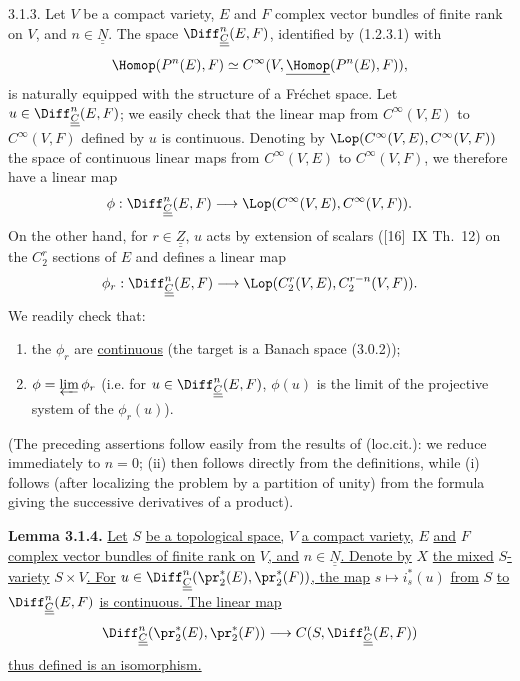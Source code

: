 3.1.3. Let $V$ be a compact variety, $E$ and $F$ complex vector bundles of finite rank on $V$, and $n\in\underline{\underline{N}}$. The space $\Diff^n_{\underline{\underline{C}}}(E,F)$, identified by (1.2.3.1) with
\[
  \Homop(P^n(E),F)\simeq C^\infty(V,\underline{\Homop}(P^n(E),F)),
\]
is naturally equipped with the structure of a Fréchet space. Let $u\in\Diff^n_{\underline{\underline{C}}}(E,F)$; we easily check that the linear map from $C^\infty(V,E)$ to $C^\infty(V,F)$ defined by $u$ is continuous. Denoting by $\Lop(C^\infty(V,E),C^\infty(V,F))$ the space of continuous linear maps from $C^\infty(V,E)$ to $C^\infty(V,F)$, we therefore have a linear map
\[
  \phi:\Diff^n_{\underline{\underline{C}}}(E,F)
  \longrightarrow \Lop(C^\infty(V,E),C^\infty(V,F)).
\]
On the other hand, for $r\in\underline{\underline{Z}}$, $u$ acts by extension of scalars ([16]~IX Th.~12) on the $C^r_2$ sections of $E$ and defines a linear map
\[
  \phi_r:\Diff^n_{\underline{\underline{C}}}(E,F)
  \longrightarrow \Lop(C^r_2(V,E),C^{r-n}_2(V,F)).
\]
We readily check that:
\begin{enumerate}[label=(\roman*)]
\item the $\phi_r$ are \uline{continuous} (the target is a Banach space
%
(3.0.2));
\item $\phi=\varprojlim\phi_r$ (i.e.
for $u\in\Diff^n_{\underline{\underline{C}}}(E,F)$, $\phi(u)$ is the limit of the projective system of the $\phi_r(u)$).
\end{enumerate}
(The preceding assertions follow easily from the results of (loc.cit.): we reduce immediately to $n=0$; (ii) then follows directly from the definitions, while (i) follows (after localizing the problem by a partition of unity) from the formula giving the successive derivatives of a product).

\textbf{Lemma 3.1.4.} \uline{Let} $S$ \uline{be a topological space,} $V$ \uline{a compact variety,} $E$ \uline{and} $F$ \uline{complex vector bundles of finite rank on} $V$\uline{, and} $n\in\underline{\underline{N}}$\uline{. Denote by} $X$ \uline{the mixed} $S$\uline{-variety} $S\times V$\uline{. For} $u\in\Diff^n_{\underline{\underline{C}}}(\pr_2^*(E),\pr_2^*(F))$\uline{, the map} $s\mapsto i_s^*(u)$ \uline{from} $S$ \uline{to} $\Diff^n_{\underline{\underline{C}}}(E,F)$ \uline{is continuous. The linear map}
\[
  \Diff^n_{\underline{\underline{C}}}(\pr_2^*(E),\pr_2^*(F))
  \longrightarrow C(S,\Diff^n_{\underline{\underline{C}}}(E,F))
\]
\uline{thus defined is an isomorphism.}

